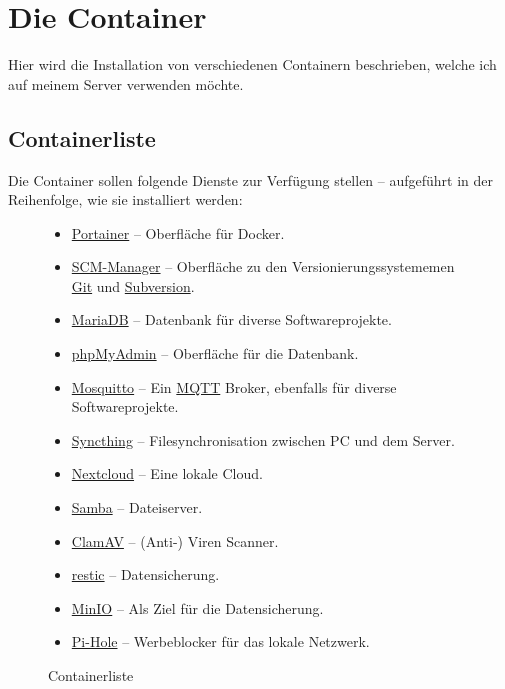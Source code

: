 \documentclass[12pt,a4paper]{article}
\begin{document}
\section{Die Container}
Hier wird die Installation von verschiedenen Containern beschrieben, welche ich auf meinem Server verwenden möchte.

\subsection{Containerliste}
Die Container sollen folgende Dienste zur Verfügung stellen -- aufgeführt in der Reihenfolge, wie sie installiert werden:

\begin{figure}[H]
\begin{itemize}
\item \href{https://www.portainer.io/}{Portainer} -- Oberfläche für Docker.
\item \href{https://www.scm-manager.org/}{SCM-Manager} -- Oberfläche zu den Versionierungssystememen \href{https://git-scm.com/}{Git}
und \href{https://subversion.apache.org/}{Subversion}.
\item \href{https://mariadb.org/}{MariaDB} -- Datenbank für diverse Softwareprojekte.
\item \href{https://www.phpmyadmin.net/}{phpMyAdmin} -- Oberfläche für die Datenbank.
\item \href{https://mosquitto.org/}{Mosquitto} -- Ein \href{http://mqtt.org/}{MQTT} Broker, ebenfalls für diverse
Softwareprojekte.
\item \href{https://syncthing.net/}{Syncthing} -- Filesynchronisation zwischen PC und dem Server.
\item \href{https://nextcloud.com/}{Nextcloud} -- Eine lokale Cloud.

\item \href{https://www.samba.org/}{Samba} -- Dateiserver.
\item \href{https://www.clamav.net/}{ClamAV} -- (Anti-) Viren Scanner.
\item \href{https://restic.net/}{restic} -- Datensicherung.
\item \href{https://docs.min.io/}{MinIO} -- Als Ziel für die Datensicherung.
\item \href{https://pi-hole.net/}{Pi-Hole} -- Werbeblocker für das lokale Netzwerk.
\end{itemize}
\caption{Containerliste}\label{fig:Containerliste}
\end{figure}
\end{document}
